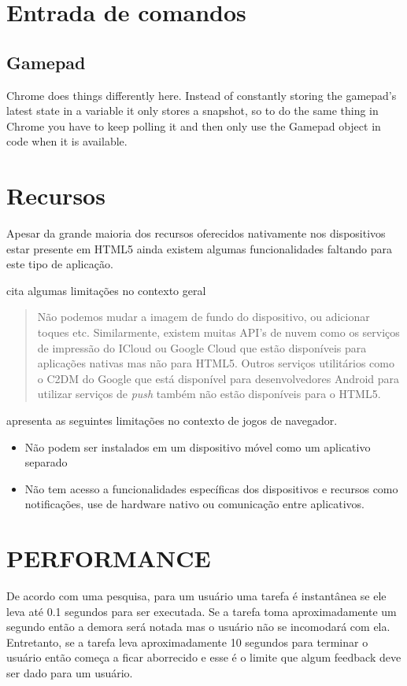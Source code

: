 \begin{draft}
\section{Entrada de comandos}

\subsection{Gamepad}
Chrome does things differently here. Instead of constantly storing the gamepad's latest state in a variable it only stores a snapshot, so to do the same thing in Chrome you have to keep polling it and then only use the Gamepad object in code when it is available.

\section{Recursos}
Apesar da grande maioria dos recursos oferecidos nativamente
nos dispositivos estar presente em HTML5 ainda existem algumas
funcionalidades faltando para este tipo de aplicação.

\cite{html5Tradeoffs} cita algumas limitações no contexto geral
\begin{quote}
Não podemos mudar a imagem de fundo do dispositivo, ou adicionar toques
etc. Similarmente, existem muitas API's de nuvem como os serviços
de impressão do ICloud ou Google Cloud que estão disponíveis para
aplicações nativas mas não para HTML5. Outros serviços utilitários
como o C2DM do Google que está disponível para desenvolvedores Android
para utilizar serviços de \textit{push} também não estão disponíveis
para o HTML5.
\end{quote}

\cite{browserGamesTechnologyAndFuture} apresenta as seguintes limitações
no contexto de jogos de navegador.

\begin{itemize}
\item Não podem ser instalados em um dispositivo móvel como um aplicativo separado
\item Não tem acesso a funcionalidades específicas dos dispositivos e recursos como notificações, use de hardware nativo ou comunicação entre aplicativos.
\end{itemize}

\section{PERFORMANCE}

De acordo com uma pesquisa, para um usuário uma tarefa é instantânea
se ele leva até 0.1 segundos para ser executada. Se a tarefa toma
aproximadamente um segundo então a demora será notada mas o
usuário não se incomodará com ela. Entretanto, se a tarefa leva
aproximadamente 10 segundos para terminar o usuário então começa a
ficar aborrecido e esse é o limite que algum feedback deve ser dado
para um usuário.


\end{draft}
